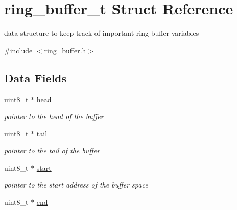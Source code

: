 \hypertarget{structring__buffer__t}{}\section{ring\+\_\+buffer\+\_\+t Struct Reference}
\label{structring__buffer__t}


data structure to keep track of important ring buffer variables  




{\ttfamily \#include $<$ring\+\_\+buffer.\+h$>$}

\subsection*{Data Fields}
\begin{DoxyCompactItemize}
\item 
\hypertarget{structring__buffer__t_ad378c88649184097a59ce43dad14dc5d}{}\label{structring__buffer__t_ad378c88649184097a59ce43dad14dc5d} 
uint8\+\_\+t $\ast$ \hyperlink{structring__buffer__t_ad378c88649184097a59ce43dad14dc5d}{head}
\begin{DoxyCompactList}\small\item\em pointer to the head of the buffer \end{DoxyCompactList}\item 
\hypertarget{structring__buffer__t_a5224aa2e8568c39b4eddac36cac4d2fe}{}\label{structring__buffer__t_a5224aa2e8568c39b4eddac36cac4d2fe} 
uint8\+\_\+t $\ast$ \hyperlink{structring__buffer__t_a5224aa2e8568c39b4eddac36cac4d2fe}{tail}
\begin{DoxyCompactList}\small\item\em pointer to the tail of the buffer \end{DoxyCompactList}\item 
\hypertarget{structring__buffer__t_af1c321b3dd7fb5f88bbe75f1aff43d97}{}\label{structring__buffer__t_af1c321b3dd7fb5f88bbe75f1aff43d97} 
uint8\+\_\+t $\ast$ \hyperlink{structring__buffer__t_af1c321b3dd7fb5f88bbe75f1aff43d97}{start}
\begin{DoxyCompactList}\small\item\em pointer to the start address of the buffer space \end{DoxyCompactList}\item 
\hypertarget{structring__buffer__t_a02274fe55b5bc829813a11b3450f3b14}{}\label{structring__buffer__t_a02274fe55b5bc829813a11b3450f3b14} 
uint8\+\_\+t $\ast$ \hyperlink{structring__buffer__t_a02274fe55b5bc829813a11b3450f3b14}{end}

\end{DoxyCompactItemize}
